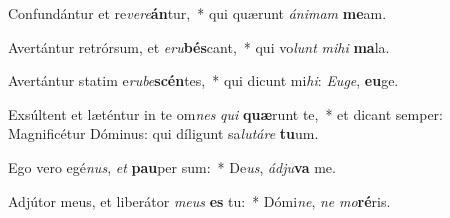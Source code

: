 \item Confundántur et re\textit{ve}\textit{re}\textbf{án}tur,~* qui quærunt \textit{á}\textit{ni}\textit{mam} \textbf{me}am.
\item Avertántur retrórsum, et \textit{e}\textit{ru}\textbf{bés}cant,~* qui vo\textit{lunt} \textit{mi}\textit{hi} \textbf{ma}la.
\item Avertántur statim e\textit{ru}\textit{be}\textbf{scén}tes,~* qui dicunt mi\textit{hi}: \textit{Eu}\textit{ge}, \textbf{eu}ge.
\item Exsúltent et læténtur in te om\textit{nes} \textit{qui} \textbf{quæ}runt te,~* et dicant semper: Magnificétur Dóminus: qui díligunt sa\textit{lu}\textit{tá}\textit{re} \textbf{tu}um.
\item Ego vero egé\textit{nus}, \textit{et} \textbf{pau}per sum:~* De\textit{us}, \textit{ád}\textit{ju}\textbf{va} me.
\item Adjútor meus, et liberátor \textit{me}\textit{us} \textbf{es} tu:~* Dómi\textit{ne}, \textit{ne} \textit{mo}\textbf{ré}ris.
